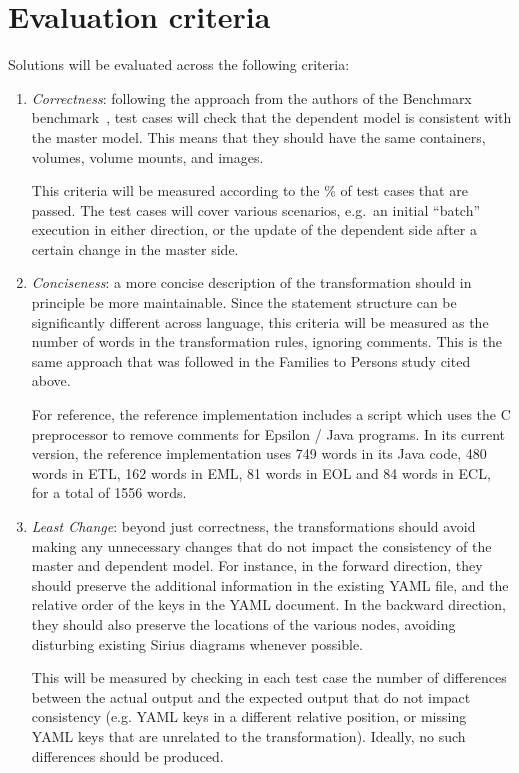 \documentclass[sigconf,review]{acmart}
\begin{document}
\section{Evaluation criteria}

Solutions will be evaluated across the following criteria:

\begin{enumerate}
\item \emph{Correctness}: following the approach from the authors of the
  Benchmarx benchmark~\cite{anjorin_benchmarking_2020}, test cases will check
  that the dependent model is consistent with the master model. This means that
  they should have the same containers, volumes, volume mounts, and images.

  This criteria will be measured according to the \% of test cases that are
  passed. The test cases will cover various scenarios, e.g.\ an initial
  ``batch'' execution in either direction, or the update of the dependent side
  after a certain change in the master side.

\item \emph{Conciseness}: a more concise description of the transformation
  should in principle be more maintainable. Since the statement structure can be
  significantly different across language, this criteria will be measured as the
  number of words in the transformation rules, ignoring comments. This is the
  same approach that was followed in the Families to Persons study cited above.

  For reference, the reference implementation includes a 
  script which uses the C preprocessor to remove comments for Epsilon / Java
  programs. In its current version, the reference implementation uses 749 words
  in its Java code, 480 words in ETL, 162 words in EML, 81 words in EOL and 84
  words in ECL, for a total of 1556 words.

\item \emph{Least Change}: beyond just correctness, the transformations should
  avoid making any unnecessary changes that do not impact the consistency of the
  master and dependent model. For instance, in the forward direction, they
  should preserve the additional information in the existing YAML file, and the
  relative order of the keys in the YAML document. In the backward direction,
  they should also preserve the locations of the various nodes, avoiding
  disturbing existing Sirius diagrams whenever possible.

  This will be measured by checking in each test case the number of differences
  between the actual output and the expected output that do not impact
  consistency (e.g. YAML keys in a different relative position, or missing YAML
  keys that are unrelated to the transformation). Ideally, no such differences
  should be produced.

\end{enumerate}
\end{document}

